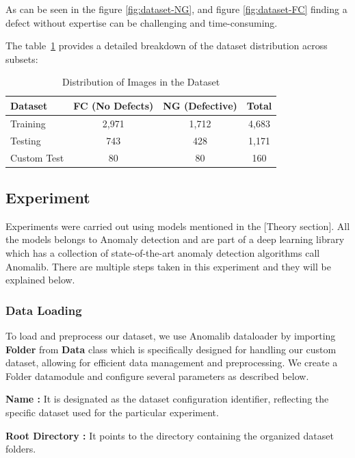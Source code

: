 As can be seen in the figure \ref{fig:dataset-NG}, and figure \ref{fig:dataset-FC} finding a defect without expertise can be challenging and time-consuming.

The table~\ref{tab:dataset-distribution} provides a detailed breakdown of the dataset distribution across subsets:

\begin{table}[ht!]
    \centering
    \begin{tabular}{|l|c|c|c|}
        \hline
        \textbf{Dataset} & \textbf{FC (No Defects)} & \textbf{NG (Defective)} & \textbf{Total} \\
        \hline
        Training & 2,971 & 1,712 & 4,683 \\
        \hline
        Testing & 743 & 428 & 1,171 \\
        \hline
        Custom Test & 80 & 80 & 160 \\
        \hline
    \end{tabular}
    \caption{Distribution of Images in the Dataset}
    \label{tab:dataset-distribution}
\end{table}

\subsection{Experiment}

Experiments were carried out using models mentioned in the [Theory section]. All the models belongs to Anomaly detection and are part of a deep learning library which has a collection of state-of-the-art anomaly detection algorithms call Anomalib. There are multiple steps taken in this experiment and they will be explained below.

\subsubsection{Data Loading}

To load and preprocess our dataset, we use Anomalib dataloader by importing \textbf{Folder} from \textbf{Data} class which is specifically designed for handling our custom dataset, allowing for efficient data management and preprocessing. We create a Folder datamodule and configure several parameters as described below.

\textbf{Name :} It is designated as the dataset configuration identifier, reflecting the specific dataset used for the particular experiment.

\textbf{Root Directory :} It points to the directory containing the organized dataset folders.

